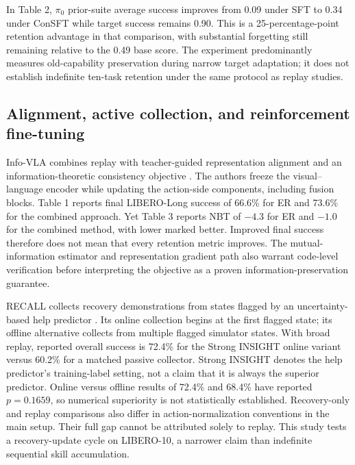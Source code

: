 \documentclass[11pt,a4paper]{article}
\begin{document}
In Table 2, $\pi_0$ prior-suite average success improves from 0.09 under SFT to 0.34 under ConSFT while target success remains 0.90. This is a 25-percentage-point retention advantage in that comparison, with substantial forgetting still remaining relative to the 0.49 base score. The experiment predominantly measures old-capability preservation during narrow target adaptation; it does not establish indefinite ten-task retention under the same protocol as replay studies.

\subsection{Alignment, active collection, and reinforcement fine-tuning}
Info-VLA combines replay with teacher-guided representation alignment and an information-theoretic consistency objective \cite{info}. The authors freeze the visual--language encoder while updating the action-side components, including fusion blocks. Table 1 reports final LIBERO-Long success of 66.6\% for ER and 73.6\% for the combined approach. Yet Table 3 reports NBT of $-4.3$ for ER and $-1.0$ for the combined method, with lower marked better. Improved final success therefore does not mean that every retention metric improves. The mutual-information estimator and representation gradient path also warrant code-level verification before interpreting the objective as a proven information-preservation guarantee.

RECALL collects recovery demonstrations from states flagged by an uncertainty-based help predictor \cite{recall}. Its online collection begins at the first flagged state; its offline alternative collects from multiple flagged simulator states. With broad replay, reported overall success is 72.4\% for the Strong INSIGHT online variant versus 60.2\% for a matched passive collector. Strong INSIGHT denotes the help predictor's training-label setting, not a claim that it is always the superior predictor. Online versus offline results of 72.4\% and 68.4\% have reported $p=0.1659$, so numerical superiority is not statistically established. Recovery-only and replay comparisons also differ in action-normalization conventions in the main setup. Their full gap cannot be attributed solely to replay. This study tests a recovery-update cycle on LIBERO-10, a narrower claim than indefinite sequential skill accumulation.
\end{document}
